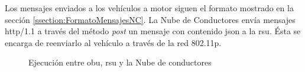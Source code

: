 Los mensajes enviados a los vehículos a motor siguen el formato mostrado en
la sección \ref{ssection:FormatoMensajesNC}. La Nube de Conductores envía
mensajes \Gls{http/1.1} a través del método \emph{post} un mensaje con
contenido \gls{json} a la \gls{rsu}. Ésta se encarga de reenviarlo al vehículo
a través de la red \Gls{802.11p}.

\begin{figure}[h]
	\begin{center}
		\caption{Ejecución entre \gls{obu}, \gls{rsu} y la Nube de conductores}
		\label{fig:DiagSecuencia-OBU_Cloud}
	\end{center}
\end{figure}
\FloatBarrier
